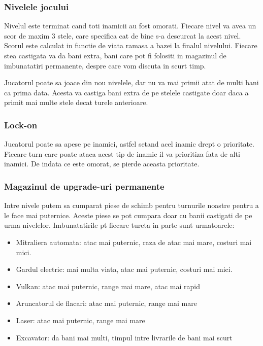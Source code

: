 \documentclass[12pt, a4paper]{article}
\begin{document}
	
	
	\subsubsection{Nivelele jocului}
	
	Nivelul este terminat cand toti inamicii au fost omorati. Fiecare nivel va avea un scor de maxim 3 stele, care specifica cat de bine s-a descurcat la acest nivel. Scorul este calculat in functie de viata ramasa a bazei la finalul nivelului. Fiecare stea castigata va da bani extra, bani care pot fi folositi in magazinul de imbunatatiri permanente, despre care vom discuta in scurt timp.
	
	Jucatorul poate sa joace din nou nivelele, dar nu va mai primii atat de multi bani ca prima data. Acesta va castiga bani extra de pe stelele castigate doar daca a primit mai multe stele decat turele anterioare.
	
	
	
	\subsubsection{Lock-on}
	
	Jucatorul poate sa apese pe inamici, astfel setand acel inamic drept o prioritate. Fiecare turn care poate ataca acest tip de inamic il va prioritiza fata de alti inamici. De indata ce este omorat, se pierde aceasta prioritate.
	
	
	
	\subsubsection{Magazinul de upgrade-uri permanente}
	
	Intre nivele putem sa cumparat piese de schimb pentru turnurile noastre pentru a le face mai puternice. Aceste piese se pot cumpara doar cu banii castigati de pe urma nivelelor. Imbunatatirile pt fiecare tureta in parte sunt urmatoarele:
	
	\begin{itemize}
		\item Mitraliera automata: atac mai puternic, raza de atac mai mare, costuri mai mici.
		\item Gardul electric: mai multa viata, atac mai puternic, costuri mai mici.
		\item Vulkan: atac mai puternic, range mai mare, atac mai rapid
		\item Aruncatorul de flacari: atac mai puternic, range mai mare
		\item Laser: atac mai puternic, range mai mare
		\item Excavator: da bani mai multi, timpul intre livrarile de bani mai scurt
	\end{itemize}
	
\end{document}
